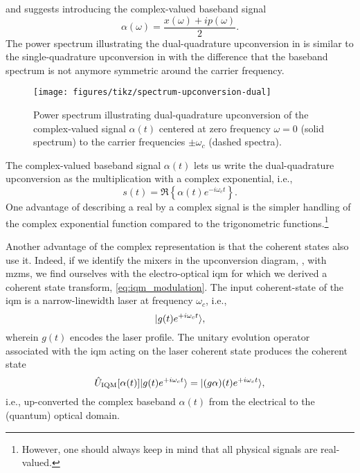 and suggests introducing the complex-valued baseband signal
\begin{equation}
	\alpha(\omega)
	=
	\frac{
		x(\omega)
		+
		ip(\omega)
	}{2}
	.
\end{equation}
The power spectrum illustrating the dual-quadrature upconversion in  is similar to the single-quadrature upconversion in  with the difference that the baseband spectrum is not anymore symmetric around the carrier frequency.
\begin{figure}[htb]
	\centering
	\texttt{[image: figures/tikz/spectrum-upconversion-dual]}
	\caption{Power spectrum illustrating dual-quadrature upconversion of the complex-valued signal $\alpha(t)$ centered at zero frequency $\omega=0$ (solid spectrum) to the carrier frequencies $\pm\omega_c$ (dashed spectra).}\label{fig:spectrum_upconversion_dual}
\end{figure}
The complex-valued baseband signal $\alpha(t)$ lets us write the dual-quadrature upconversion as the multiplication with a complex exponential, i.e.,
\begin{equation}
	s(t)
	=
	\Re\left\{
		\alpha(t)
		e^{-i\omega_ct}
	\right\}
	.
	\label{eq:real_complex_passband}
\end{equation}
One advantage of describing a real by a complex signal is the simpler handling of the complex exponential function compared to the trigonometric functions.\footnote{However, one should always keep in mind that all physical signals are real-valued.}

Another advantage of the complex representation is that the coherent states also use it.
Indeed, if we identify the mixers in the upconversion diagram, , with \glspl{mzm}, we find ourselves with the electro-optical \gls{iqm} for which we derived a coherent state transform, \cref{eq:iqm_modulation}.
The input coherent-state of the \gls{iqm} is a narrow-linewidth laser at frequency $\omega_c$, i.e.,
\begin{equation}
	\lvert g(t)e^{+i\omega_ct}\rangle
	,
\end{equation}
wherein $g(t)$ encodes the laser profile.
The unitary evolution operator associated with the \gls{iqm} acting on the laser coherent state produces the coherent state
\begin{equation}
	\hat{U}_\text{IQM}[\alpha(t)]
	\lvert g(t)e^{+i\omega_ct}\rangle
	=
	\lvert(g\alpha)(t)e^{+i\omega_ct}\rangle
	,
\end{equation}
i.e., up-converted the complex baseband $\alpha(t)$ from the electrical to the (quantum) optical domain.